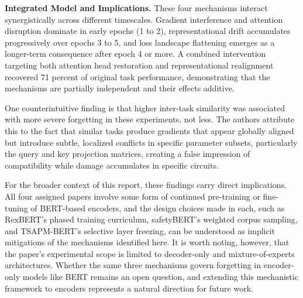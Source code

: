 \documentclass[a4paper,12pt]{article}
\begin{document}
\textbf{Integrated Model and Implications.} These four mechanisms interact
synergistically across different timescales. Gradient interference and attention
disruption dominate in early epochs (1 to 2), representational drift accumulates
progressively over epochs 3 to 5, and loss landscape flattening emerges as a
longer-term consequence after epoch 4 or more. A combined intervention targeting
both attention head restoration and representational realignment recovered 71 percent
of original task performance, demonstrating that the mechanisms are partially
independent and their effects additive.

One counterintuitive finding is that higher inter-task similarity was associated with
more severe forgetting in these experiments, not less. The authors attribute this to
the fact that similar tasks produce gradients that appear globally aligned but
introduce subtle, localized conflicts in specific parameter subsets, particularly the
query and key projection matrices, creating a false impression of compatibility while
damage accumulates in specific circuits.

For the broader context of this report, these findings carry direct implications.
All four assigned papers involve some form of continued pre-training or fine-tuning
of BERT-based encoders, and the design choices made in each, such as RexBERT's
phased training curriculum, safetyBERT's weighted corpus sampling, and TSAPM-BERT's
selective layer freezing, can be understood as implicit mitigations of the mechanisms
identified here. It is worth noting, however, that the paper's experimental scope
is limited to decoder-only and mixture-of-experts architectures. Whether the same
three mechanisms govern forgetting in encoder-only models like BERT remains an open
question, and extending this mechanistic framework to encoders represents a natural
direction for future work.
\end{document}
